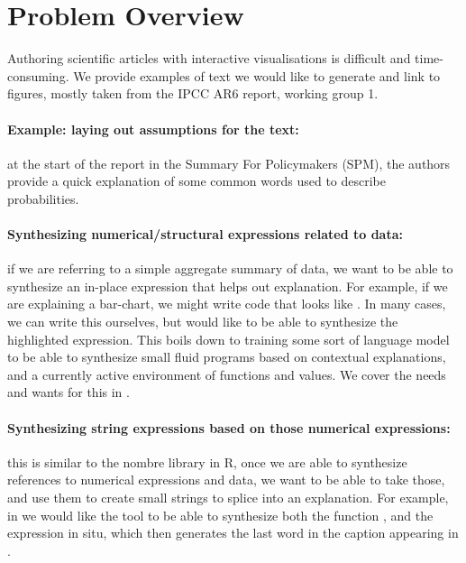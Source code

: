 \section{Problem Overview}
Authoring scientific articles with interactive visualisations is difficult
and time-consuming. We provide examples of text we would like to generate
and link to figures, mostly taken from the IPCC AR6 report, working group 1.

\paragraph*{Example: laying out assumptions for the text:} at the start of
the report in the Summary For Policymakers (SPM), the authors provide a
quick explanation of some common words used to describe probabilities.



\paragraph*{Synthesizing numerical/structural expressions related to data:}

if we are referring to a simple aggregate summary of data, we want to be able
to synthesize an in-place expression that helps out explanation. For example,
if we are explaining a bar-chart, we might write code that looks like .
In many cases, we can write this ourselves, but would like to be able to
synthesize the highlighted expression. This boils down to training some sort of
language model to be able to synthesize small fluid programs based on contextual
explanations, and a currently active environment of functions and values. We cover
the needs and wants for this in .

\paragraph*{Synthesizing string expressions based on those numerical expressions:}
this is similar to the nombre library in R, once we are able to synthesize references
to numerical expressions and data, we want to be able to take those, and use them to
create small strings to splice into an explanation. For example, in 
we would like the tool to be able to synthesize both the function , and
the expression in situ, which then generates the last word in the caption appearing in
.
